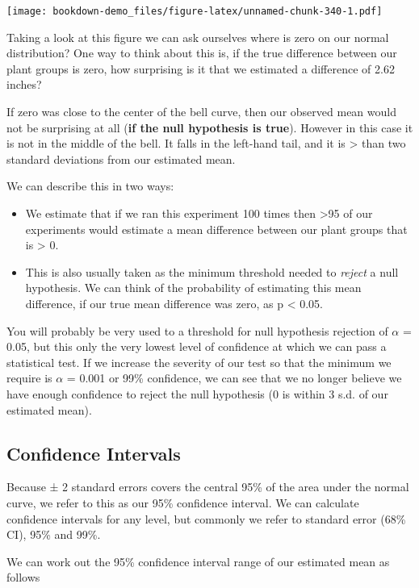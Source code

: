 \documentclass[
]{book}
\begin{document}
\texttt{[image: bookdown-demo\_files/figure-latex/unnamed-chunk-340-1.pdf]}

Taking a look at this figure we can ask ourselves where is zero on our normal distribution? One way to think about this is, if the true difference between our plant groups is zero, how surprising is it that we estimated a difference of 2.62 inches?

If zero was close to the center of the bell curve, then our observed mean would not be surprising at all (\textbf{if the null hypothesis is true}). However in this case it is not in the middle of the bell. It falls in the left-hand tail, and it is \textgreater{} than two standard deviations from our estimated mean.

We can describe this in two ways:

\begin{itemize}
\item
  We estimate that if we ran this experiment 100 times then \textgreater95 of our experiments would estimate a mean difference between our plant groups that is \textgreater{} 0.
\item
  This is also usually taken as the minimum threshold needed to \emph{reject} a null hypothesis. We can think of the probability of estimating this mean difference, if our true mean difference was zero, as p \textless{} 0.05.
\end{itemize}

You will probably be very used to a threshold for null hypothesis rejection of \(\alpha\) = 0.05, but this only the very lowest level of confidence at which we can pass a statistical test. If we increase the severity of our test so that the minimum we require is \(\alpha\) = 0.001 or 99\% confidence, we can see that we no longer believe we have enough confidence to reject the null hypothesis (0 is within 3 s.d. of our estimated mean).

\hypertarget{confidence-intervals}{%
\subsection{Confidence Intervals}\label{confidence-intervals}}

Because ± 2 standard errors covers the central 95\% of the area under the normal curve, we refer to this as our 95\% confidence interval. We can calculate confidence intervals for any level, but commonly we refer to standard error (68\% CI), 95\% and 99\%.

We can work out the 95\% confidence interval range of our estimated mean as follows
\end{document}
